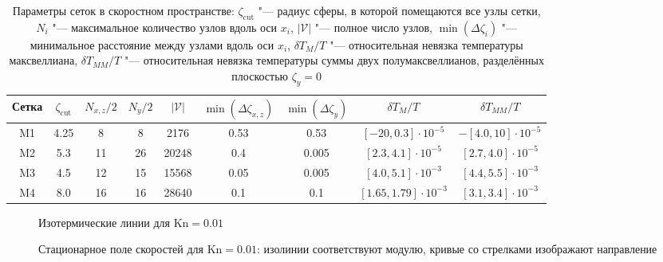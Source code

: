\documentclass[
aps,%
12pt,%
final,%
notitlepage,%
oneside,%
onecolumn,%
nobibnotes,%
nofootinbib,%
superscriptaddress,%
noshowpacs,%
showkeys,%
floatfix,%
tightenlines,%
centertags]%
{revtex4}
\newcommand{\Kn}{\mathrm{Kn}}
\begin{document}
\setlength{\tabcolsep}{4pt}
\begin{table}
    \caption{Параметры сеток в скоростном пространстве:
        \(\zeta_{\mathrm{cut}}\) "--- радиус сферы, в которой помещаются все узлы сетки,
        \(N_i\) "--- максимальное количество узлов вдоль оси \(x_i\),
        \(|\mathcal{V}|\) "--- полное число узлов,
        \(\min(\Delta\zeta_i)\) "--- минимальное расстояние между узлами вдоль оси \(x_i\),
        \(\delta T_M/T\) "--- относительная невязка температуры максвеллиана,
        \(\delta T_{MM}/T\) "--- относительная невязка температуры суммы двух полумаксвеллианов,
        разделённых плоскостью \(\zeta_y=0\)}
    \label{table:velocity_grids}
    \centering
    \begin{tabular}{ccccccccc}
        Сетка & \(\zeta_{\mathrm{cut}}\) & \(N_{x,z}/2\) & \(N_y/2\) & \(|\mathcal{V}|\)
            & \(\min(\Delta\zeta_{x,z})\) & \(\min(\Delta\zeta_y)\) & \(\delta T_M/T\) & \(\delta T_{MM}/T\) \\\hline
        M1 & 4.25 & 8  & 8  & 2176  & 0.53 & 0.53  & \([-20,0.3]\cdot10^{-5}\)   & \(-[4.0,10]\cdot10^{-5}\) \\
        M2 & 5.3  & 11 & 26 & 20248 & 0.4  & 0.005 & \([2.3,4.1]\cdot10^{-5}\)   & \([2.7,4.0]\cdot10^{-5}\) \\
        M3 & 4.5  & 12 & 15 & 15568 & 0.05 & 0.005 & \([4.0,5.1]\cdot10^{-3}\)   & \([4.4,5.5]\cdot10^{-3}\) \\
        M4 & 8.0  & 16 & 16 & 28640 & 0.1  & 0.1   & \([1.65,1.79]\cdot10^{-3}\) & \([3.1,3.4]\cdot10^{-3}\) \\
    \end{tabular}
\end{table}

\begin{figure}
    \centering
    \caption{Изотермические линии для \(\Kn=0.01\)}
    \label{fig:kn0.01:temp}
\end{figure}

\begin{figure}
    \centering
    \caption{Стационарное поле скоростей для \(\Kn=0.01\):
        изолинии соответствуют модулю, кривые со стрелками изображают направление}
    \label{fig:kn0.01:flow}
\end{figure}
\end{document}
